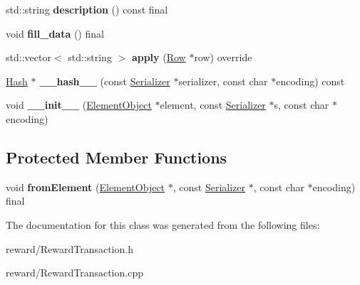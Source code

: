 \begin{DoxyCompactItemize}
std\+::string {\bfseries description} () const final
\item 
\mbox{\label{classReward_a30a40e2eefd0aea969fab46d1e22d145}} 
void {\bfseries fill\+\_\+data} () final
\item 
\mbox{\label{classReward_aae55ec2aa2aa31cc365c80cb42be9ab5}} 
std\+::vector$<$ std\+::string $>$ {\bfseries apply} (\mbox{\hyperlink{classRow}{Row}} $\ast$row) override
\item 
\mbox{\label{classTransaction_a1f0df166c34d6a38a991544cf98c0356}} 
\mbox{\hyperlink{classHash}{Hash}} $\ast$ {\bfseries \+\_\+\+\_\+hash\+\_\+\+\_\+} (const \mbox{\hyperlink{classSerializer}{Serializer}} $\ast$serializer, const char $\ast$encoding) const
\item 
\mbox{\label{classComponent_a28212595f8ee85fe009bd233bc99b2fc}} 
void {\bfseries \+\_\+\+\_\+init\+\_\+\+\_\+} (\mbox{\hyperlink{classElementObject}{Element\+Object}} $\ast$element, const \mbox{\hyperlink{classSerializer}{Serializer}} $\ast$s, const char $\ast$encoding)
\end{DoxyCompactItemize}
\subsection*{Protected Member Functions}
\begin{DoxyCompactItemize}
\item 
\mbox{\label{classReward_a6d16e21b60b7f11c7aaf0098a53118a2}} 
void {\bfseries from\+Element} (\mbox{\hyperlink{classElementObject}{Element\+Object}} $\ast$, const \mbox{\hyperlink{classSerializer}{Serializer}} $\ast$, const char $\ast$encoding) final
\end{DoxyCompactItemize}


The documentation for this class was generated from the following files\+:\begin{DoxyCompactItemize}
\item 
reward/Reward\+Transaction.\+h\item 
reward/Reward\+Transaction.\+cpp\end{DoxyCompactItemize}
